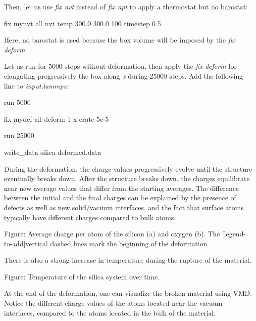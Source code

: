 \noindent Then, let us use \textit{fix nvt} instead of \textit{fix npt} to apply a
thermostat but no barostat:

\begin{lcverbatim}
fix mynvt all nvt temp 300.0 300.0 100
timestep 0.5
\end{lcverbatim}

\noindent \begin{tcolorbox}[colback=mylightblue!5!white,colframe=mylightblue!75!black,title=Note]

\vspace{0.25cm} \noindent Here, no barostat is used because the box volume will be imposed by
the \textit{fix deform}.
\end{tcolorbox}

\noindent Let us run for 5000 steps without deformation, then apply the \textit{fix deform}
for elongating progressively the box along \textit{x} during 25000 steps. Add the
following line to \textit{input.lammps}:

\begin{lcverbatim}
run 5000

fix mydef all deform 1 x erate 5e-5

run 25000

write_data silica-deformed.data
\end{lcverbatim}

\noindent During the deformation, the charge values progressively evolve until the structure
eventually breaks down. After the structure breaks down, the charges
equilibrate near new average values that differ from the starting averages.
The difference between the initial and the final charges can be explained by
the presence of defects as well as new solid/vacuum interfaces, and the fact
that surface atoms typically have different charges compared to bulk atoms.

\vspace{0.25cm} Figure: Average charge per atom of the silicon (a) and oxygen (b). The
[legend-to-add]vertical dashed lines mark the beginning of the deformation.

\vspace{0.25cm} \noindent There is also a strong increase in temperature during the rupture of the
material.

\vspace{0.25cm} Figure: Temperature of the silica system over time.

\vspace{0.25cm} \noindent At the end of the deformation, one can visualize the broken material using
VMD. Notice the different charge values of the atoms located near the vacuum
interfaces, compared to the atoms located in the bulk of the material.

